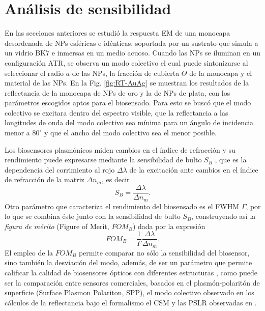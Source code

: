 \section{Análisis de sensibilidad}
\label{section:sensLambda}

En las secciones anteriores se estudió la respuesta EM de una monocapa desordenada de NPs esféricas e idénticas, soportada por un sustrato que simula a un vidrio BK7 e inmersas en un medio acuoso. Cuando las NPs se iluminan en un configuración ATR, se observa un modo colectivo el cual puede sintonizarse al seleccionar el radio $a$ de las NPs, la fracción de cubierta $\Theta$ de la monocapa y el material de las NPs. En la Fig. \ref{fig:RT-AuAg} se muestran los resultados de la reflectancia de la monocapa de NPs de oro y la de NPs de plata, con los parámetros escogidos aptos para el biosensado. Para esto se buscó que el modo colectivo se excitara dentro del espectro visible, que la reflectancia a las longitudes de onda del modo colectivo sea mínima para un ángulo de incidencia menor a $80^\circ$ y que el ancho del modo colectivo sea el menor posible.

Los biosensores plasmónicos miden cambios en el índice de refracción y su rendimiento puede expresarse mediante la sensibilidad de bulto $S_B$ \cite{estevez2014trends,svedendahl2009refractometric}, que es la dependencia del corrimiento al rojo $\Delta \lambda$ de la excitación ante cambios en el índice de refracción de la matriz $\Delta n_m$, es decir
	\begin{equation}
	S_B = \frac{\Delta \lambda}{\Delta n_m}.
	\end{equation}
Otro parámetro que caracteriza el rendimiento del biosensado es el FWHM $\Gamma$, por lo que se combina éste junto con la sensibilidad de bulto $S_B$, construyendo así la \emph{figura de mérito} (Figure of Merit, $FOM_B$) dada por la expresión
	\begin{equation}
	FOM_B = \frac{1}{\Gamma}\frac{\Delta \lambda}{\Delta n_m}.
	\end{equation}
El empleo de la $FOM_B$ permite comparar no sólo la sensibilidad del biosensor, sino también la desviación del modo, además, de ser un parámetro que permite calificar la calidad de biosensores ópticos con diferentes estructuras \cite{svedendahl2009refractometric}, como puede ser la comparación entre sensores comerciales, basados en el plasmón-polaritón de superficie (Surface Plasmon Polariton, SPP), el modo colectivo observado en los cálculos de la reflectancia bajo el formalismo el CSM y las PSLR observadas en \cite{kabashin2009plasmonic,danilov2018ultra}.

